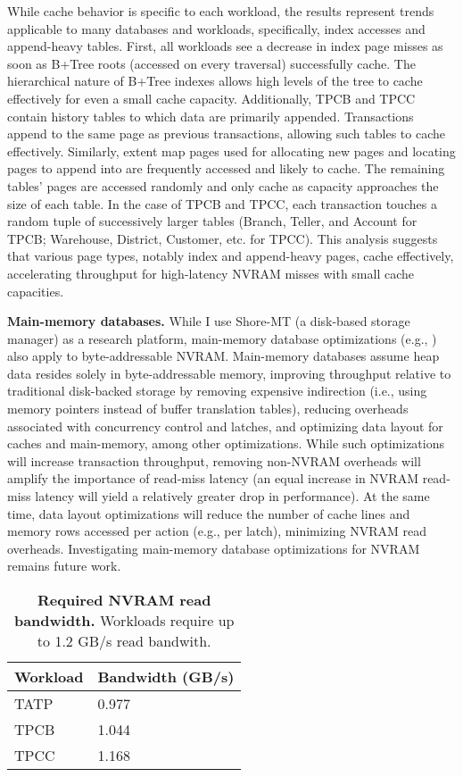 While cache behavior is specific to each workload, the results represent trends applicable to many databases and workloads, specifically, index accesses and append-heavy tables.
First, all workloads see a decrease in index page misses as soon as B+Tree roots (accessed on every traversal) successfully cache.
The hierarchical nature of B+Tree indexes allows high levels of the tree to cache effectively for even a small cache capacity.
Additionally, TPCB and TPCC contain history tables to which data are primarily appended.
Transactions append to the same page as previous transactions, allowing such tables to cache effectively.
Similarly, extent map pages used for allocating new pages and locating pages to append into are frequently accessed and likely to cache.
The remaining tables' pages are accessed randomly and only cache as capacity approaches the size of each table.
In the case of TPCB and TPCC, each transaction touches a random tuple of successively larger tables (Branch, Teller, and Account for TPCB; Warehouse, District, Customer, etc. for TPCC).
This analysis suggests that various page types, notably index and append-heavy pages, cache effectively, accelerating throughput for high-latency NVRAM misses with small cache capacities.

\textbf{Main-memory databases.}
While I use Shore-MT (a disk-based storage manager) as a research platform, main-memory database optimizations (e.g., \cite{DiaconuFreedman13, BallardBehman11, Oracle09}) also apply to byte-addressable NVRAM.
Main-memory databas\-es assume heap data resides solely in byte-addressable memory, improving throughput relative to traditional disk-back\-ed storage by removing expensive indirection (i.e., using memory pointers instead of buffer translation tables), reducing overheads associated with concurrency control and latches, and optimizing data layout for caches and main-memory, among other optimizations.
While such optimizations will increase transaction throughput, removing non-NVRAM overheads will amplify the importance of read-miss latency (an equal increase in NVRAM read-miss latency will yield a relatively greater drop in performance).
At the same time, data layout optimizations will reduce the number of cache lines and memory rows accessed per action (e.g., per latch), minimizing NVRAM read overheads.
Investigating main-memory database optimizations for NVRAM remains future work.

\begin{table}
  \centering
  \begin{tabular}{l l}
    \hline
    Workload & Bandwidth (GB/s) \\
    \hline \hline
    TATP & 0.977 \\
    TPCB & 1.044 \\
    TPCC & 1.168 \\
    \hline
  \end{tabular}
  \caption{\textbf{Required NVRAM read bandwidth.} Workloads require up to 1.2 GB/s read bandwith.}
  \label{table::ReadBandwidth}
\end{table}

